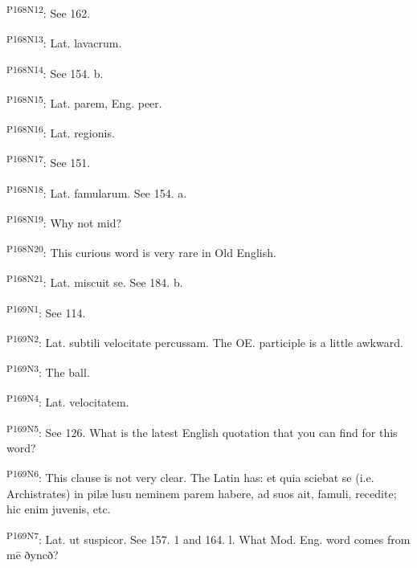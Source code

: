 \textsuperscript{P168N12}: See 162.

\textsuperscript{P168N13}: Lat. lavacrum.

\textsuperscript{P168N14}: See 154. b.

\textsuperscript{P168N15}: Lat. parem, Eng. peer.

\textsuperscript{P168N16}: Lat. regionis.

\textsuperscript{P168N17}: See 151.

\textsuperscript{P168N18}: Lat. famularum. See 154. a.

\textsuperscript{P168N19}: Why not mid?

\textsuperscript{P168N20}: This curious word is very rare in Old English.

\textsuperscript{P168N21}: Lat. miscuit se. See 184. b.

\textsuperscript{P169N1}: See 114.

\textsuperscript{P169N2}: Lat. subtili velocitate percussam. The OE. participle is a little awkward.

\textsuperscript{P169N3}: The ball.

\textsuperscript{P169N4}: Lat. velocitatem.

\textsuperscript{P169N5}: See 126. What is the latest English quotation that you can find for this word?

\textsuperscript{P169N6}: This clause is not very clear. The Latin has: et quia sciebat se (i.e. Archistrates) in pilæ lusu neminem parem habere, ad suos ait, famuli, recedite; hic enim juvenis, etc.

\textsuperscript{P169N7}: Lat. ut suspicor. See 157. 1 and 164. l. What Mod. Eng. word comes from mē ðyncð?

